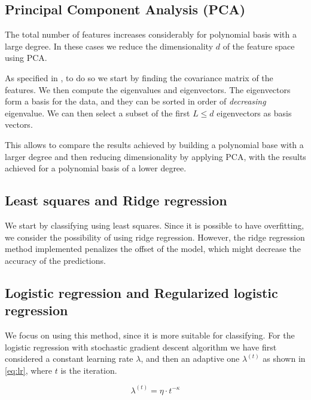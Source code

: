 \documentclass[10pt,conference,compsocconf]{IEEEtran}
\begin{document}
	\subsection{Principal Component Analysis (PCA)} %
	\label{sub:principal_component_analysis}
  	The total number of features increases considerably for polynomial basis with a large degree. In these cases we reduce the dimensionality $d$ of the feature space using PCA.

  	As specified in \cite{smith02}, to do so we start by finding the covariance matrix of the features. We then compute the eigenvalues and eigenvectors. The eigenvectors form a basis for the data, and they can be sorted in order of \emph{decreasing} eigenvalue. We can then select a subset of the first $L\leq d$ eigenvectors as basis vectors.

  	This allows to compare the results achieved by building a polynomial base with a larger degree and then reducing dimensionality by applying PCA, with the results achieved for a polynomial basis of a lower degree.

	\subsection{Least squares and Ridge regression} %
	\label{sub:least_squares_and_ridge_regression}
  	We start by classifying using least squares. Since it is possible to have overfitting, we consider the possibility of using ridge regression. However, the ridge regression method implemented penalizes the offset of the model, which might decrease the accuracy of the predictions.

	\subsection{Logistic regression and Regularized logistic regression} %
	\label{sub:logistic_regression_and_regularized_logistic_regression}
  	We focus on using this method, since it is more suitable for classifying. For the logistic regression with stochastic gradient descent algorithm we have first considered a constant learning rate $\lambda$, and then an adaptive one $\lambda^{(t)}$ as shown in \ref{eq:lr}, where $t$ is the iteration.

  	\begin{equation}
    	\label{eq:lr}
      	\lambda^{(t)} = \eta \cdot t ^{- \kappa}
  	\end{equation}
\end{document}

